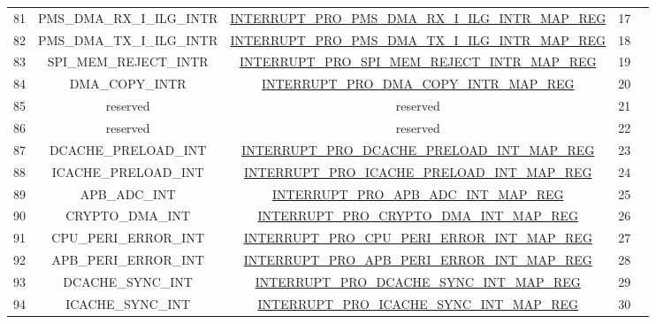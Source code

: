 \begin{footnotesize}
\begin{longtable}[c]{|*{5}{c|}}
    81 &PMS\_DMA\_RX\_I\_ILG\_INTR  &\hyperref[regdesc:INTERRUPTPROPMSDMARXIILGINTRMAPREG]{INTERRUPT\_PRO\_PMS\_DMA\_RX\_I\_ILG\_INTR\_MAP\_REG}  &17  &                          	\\
    \cline{1-4}
    82 &PMS\_DMA\_TX\_I\_ILG\_INTR  &\hyperref[regdesc:INTERRUPTPROPMSDMATXIILGINTRMAPREG]{INTERRUPT\_PRO\_PMS\_DMA\_TX\_I\_ILG\_INTR\_MAP\_REG}  &18  &                          	\\
    \cline{1-4}
    83 &SPI\_MEM\_REJECT\_INTR  &\hyperref[regdesc:INTERRUPTPROSPIMEMREJECTINTRMAPREG]{INTERRUPT\_PRO\_SPI\_MEM\_REJECT\_INTR\_MAP\_REG}  &19  &                          	\\
    \cline{1-4}
    84 &DMA\_COPY\_INTR  &\hyperref[regdesc:INTERRUPTPRODMACOPYINTRMAPREG]{INTERRUPT\_PRO\_DMA\_COPY\_INTR\_MAP\_REG}  &20  &                          	\\
    \cline{1-4}
    85 &reserved &reserved  &21  &                          	\\
    \cline{1-4}
    86 & reserved &reserved &22  &                          	\\
    \cline{1-4}
    87 &DCACHE\_PRELOAD\_INT  &\hyperref[regdesc:INTERRUPTPRODCACHEPRELOADINTMAPREG]{INTERRUPT\_PRO\_DCACHE\_PRELOAD\_INT\_MAP\_REG}  &23  &                          	\\
    \cline{1-4}
    88 &ICACHE\_PRELOAD\_INT  &\hyperref[regdesc:INTERRUPTPROICACHEPRELOADINTMAPREG]{INTERRUPT\_PRO\_ICACHE\_PRELOAD\_INT\_MAP\_REG}  &24  &                          	\\
    \cline{1-4}
    89 &APB\_ADC\_INT  &\hyperref[regdesc:INTERRUPTPROAPBADCINTMAPREG]{INTERRUPT\_PRO\_APB\_ADC\_INT\_MAP\_REG}  &25  &                          	\\
    \cline{1-4}
    90 &CRYPTO\_DMA\_INT  &\hyperref[regdesc:INTERRUPTPROCRYPTODMAINTMAPREG]{INTERRUPT\_PRO\_CRYPTO\_DMA\_INT\_MAP\_REG}  &26  &                          	\\
    \cline{1-4}
    91 &CPU\_PERI\_ERROR\_INT  &\hyperref[regdesc:INTERRUPTPROCPUPERIERRORINTMAPREG]{INTERRUPT\_PRO\_CPU\_PERI\_ERROR\_INT\_MAP\_REG}  &27  &                          	\\
    \cline{1-4}
    92 &APB\_PERI\_ERROR\_INT  &\hyperref[regdesc:INTERRUPTPROAPBPERIERRORINTMAPREG]{INTERRUPT\_PRO\_APB\_PERI\_ERROR\_INT\_MAP\_REG}  &28  &                          	\\
    \cline{1-4}
    93 &DCACHE\_SYNC\_INT  &\hyperref[regdesc:INTERRUPTPRODCACHESYNCINTMAPREG]{INTERRUPT\_PRO\_DCACHE\_SYNC\_INT\_MAP\_REG}   &29  &                          	\\
    \cline{1-4}
    94 &ICACHE\_SYNC\_INT  &\hyperref[regdesc:INTERRUPTPROICACHESYNCINTMAPREG]{INTERRUPT\_PRO\_ICACHE\_SYNC\_INT\_MAP\_REG}  &30  &                          	\\
    \hline
    



\end{longtable}
\end{footnotesize}





